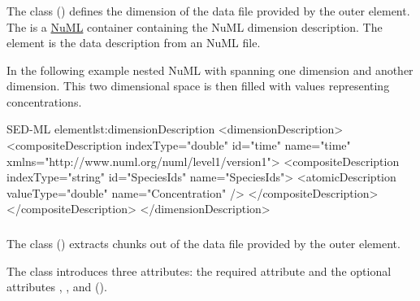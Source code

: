 \subsubsection{}
\label{class:dimensionDescription}
The  class () defines the dimension of the data file provided by the outer \SedDataDescription element. The  is a \hyperref[sec:numl]{NuML} container containing the NuML dimension description. The \hyperref[sec:dimensionDescription]{} element is the data description from an NuML file. 

In the following example nested NuML  with  spanning one dimension and  another dimension. This two dimensional space is then filled with  values representing concentrations.

\begin{myXmlLst}{SED-ML  element}{lst:dimensionDescription}
<dimensionDescription>
	<compositeDescription indexType="double" id="time" name="time" 
		xmlns="http://www.numl.org/numl/level1/version1">
		<compositeDescription indexType="string" id="SpeciesIds" name="SpeciesIds">
			<atomicDescription valueType="double" name="Concentration" />
		</compositeDescription>
	</compositeDescription>
</dimensionDescription>
\end{myXmlLst} 



\subsubsection{}
\label{class:dataSource}
The  class () extracts chunks out of the data file provided by the outer \SedDataDescription element. 

The  class introduces three attributes: the required attribute \hyperref[sec:id]{} and the optional attributes \hyperref[sec:name]{}, \hyperref[sec:indexSet]{}, and \hyperref[sec:listOfSlices]{} (). 


